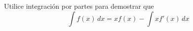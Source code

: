 \item Utilice integración por partes para demostrar que
    \[ \int f(x) \, dx = x f(x) - \int x f'(x) \, dx \]
